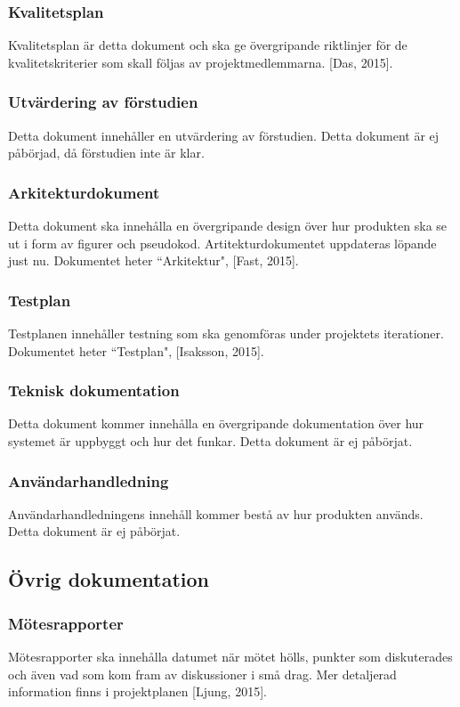 \subsubsection{Kvalitetsplan}
Kvalitetsplan är detta dokument och ska ge övergripande riktlinjer för de kvalitetskriterier som skall följas av projektmedlemmarna. [Das, 2015].

\subsubsection{Utvärdering av förstudien}
Detta dokument innehåller en utvärdering av förstudien. Detta dokument är ej påbörjad, då förstudien inte är klar. 

\subsubsection{Arkitekturdokument}
Detta dokument ska innehålla en övergripande design över hur produkten ska se ut i form av figurer och pseudokod. Artitekturdokumentet uppdateras löpande just nu. Dokumentet heter ``Arkitektur", [Fast, 2015].

\subsubsection{Testplan}
Testplanen innehåller testning som ska genomföras under projektets iterationer. Dokumentet heter ``Testplan", [Isaksson, 2015].

\subsubsection{Teknisk dokumentation}
Detta dokument kommer innehålla en övergripande dokumentation över hur systemet är uppbyggt och hur det funkar. Detta dokument är ej påbörjat. 

\subsubsection{Användarhandledning}
Användarhandledningens innehåll kommer bestå av hur produkten används. Detta dokument är ej påbörjat.

\subsection{Övrig dokumentation}

\subsubsection{Mötesrapporter}
Mötesrapporter ska innehålla datumet när mötet hölls, punkter som diskuterades och även vad som kom fram av diskussioner i små drag. Mer detaljerad information finns i projektplanen [Ljung, 2015].

